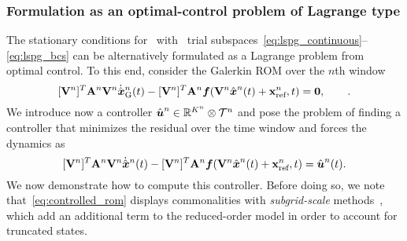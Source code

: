 \subsubsection{Formulation as an optimal-control problem of Lagrange type}\label{sec:optimal_control} 
The stationary conditions for \methodAcronym\ with \spatialAcronym\ trial subspaces~\eqref{eq:lspg_continuous}--\eqref{eq:lspg_bcs} can be alternatively formulated as a Lagrange
problem from optimal control. To this end, consider the Galerkin ROM over the $n$th window
$$ \basisspaceTArg{n} \stweightingMatArgt{n}{t} \basisspaceArg{n}
 \genstateGalerkinDotArg{n}{t} - \basisspaceTArg{n} \stweightingMatArgt{n}{t}
\velocity(\veloargsromn) = \bz,\qquad .$$
We introduce now a controller $\controllerArgnt{n} \in \RR{\romdimArg{n}} \otimes \timeSpaceArg{n}$ 
and pose the problem of finding a controller that minimizes the residual
over the time window and forces the dynamics as
\begin{equation}\label{eq:controlled_rom}
 \basisspaceTArg{n}
\stweightingMatArgt{n}{t} \basisspaceArg{n} \genstateDotArg{n}{t}  - \basisspaceTArg{n}
\stweightingMatArgt{n}{t}\velocity(\veloargsromn) = \controllerArg{n}{t}. 
 \end{equation}
We now demonstrate how to compute this controller.
Before doing so, we note that~\eqref{eq:controlled_rom} displays commonalities with \textit{subgrid-scale}
methods~\cite{iliescu_pod_eddyviscosity,iliescu_vms_pod_ns,iliescu_ciazzo_residual_rom,parish_apg,wentland_apg,Wang:269133,San2018},
which add an additional term to the reduced-order model in order to account
for truncated states. 


